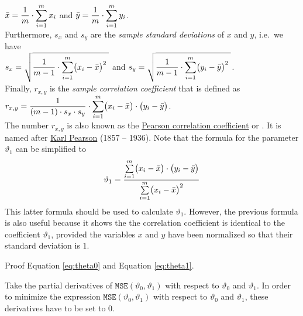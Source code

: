 \\[0.2cm]
\hspace*{1.3cm}
$\displaystyle \bar{x} = \frac{1}{m} \cdot \sum\limits_{i=1}^m x_i$ \quad and \quad
$\displaystyle \bar{y} = \frac{1}{m} \cdot \sum\limits_{i=1}^m y_i$.
\\[0.2cm]
Furthermore, $s_x$ and $s_y$ are the \emph{\color{blue}sample standard deviations} of $x$ and $y$, i.e.~we have
\\[0.2cm]
\hspace*{1.3cm}
$\displaystyle s_x = \sqrt{\frac{1}{m-1} \cdot \sum\limits_{i=1}^m \bigl(x_i - \bar{x}\bigr)^2\;}$ \quad and \quad
$\displaystyle s_y = \sqrt{\frac{1}{m-1} \cdot \sum\limits_{i=1}^m \bigl(y_i - \bar{y}\bigr)^2\;}$.
\\[0.2cm]
Finally, $r_{x,y}$ is the \emph{\color{blue}sample correlation coefficient} that is defined as
\\[0.2cm]
\hspace*{1.3cm}
$\displaystyle r_{x,y} = \frac{1}{(m-1) \cdot s_x \cdot s_y} \cdot \sum\limits_{i=1}^m \bigl(x_i - \bar{x}\bigr) \cdot \bigl(y_i - \bar{y}\bigr)$.
\\[0.2cm]
The number $r_{x,y}$ is also known as the
\href{https://en.wikipedia.org/wiki/Pearson_correlation_coefficient}{Pearson correlation coefficient} or
.  It is named after \href{https://en.wikipedia.org/wiki/Karl_Pearson}{Karl Pearson}
(1857 -- 1936).
Note that the formula for the parameter $\vartheta_1$ can be simplified to  
\begin{equation}
  \label{eq:theta1}
\displaystyle\vartheta_1 = \frac{\sum\limits_{i=1}^m \bigl(x_i - \bar{x}\bigr) \cdot \bigl(y_i - \bar{y}\bigr)}{
                        \sum\limits_{i=1}^m \bigl(x_i - \bar{x}\bigr)^2}  
\end{equation}
This latter formula should be used to calculate $\vartheta_1$.  However, the previous formula is also useful
because it shows the the correlation coefficient is identical to the coefficient $\vartheta_1$, provided the variables $x$ and
$y$ have been normalized so that their standard deviation is $1$.

\exercise
Proof Equation \ref{eq:theta0} and Equation \ref{eq:theta1}.

\hint
Take the partial derivatives of $\mathtt{MSE}(\vartheta_0, \vartheta_1)$ with respect to $\vartheta_0$ and
$\vartheta_1$.  In order to minimize the expression  $\mathtt{MSE}(\vartheta_0, \vartheta_1)$ with respect to
$\vartheta_0$ and $\vartheta_1$, these derivatives have to be set to $0$.
\eox

